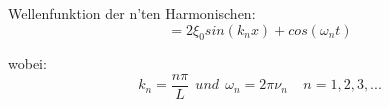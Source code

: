 \documentclass[7pt]{article}
\begin{document}
\begin{multicols*}{3}
Wellenfunktion der n'ten Harmonischen:
\begin{equation*}
= 2 \xi _0 sin(k_n x) + cos(\omega _n t)
\end{equation*}

wobei:
\begin{equation*}
k_n = \frac{n\pi}{L} \>\> und \>\> \omega _n = 2\pi \nu _n \>\>\>\>\> n=1,2,3,...
\end{equation*}

\end{multicols*}
\end{document}
